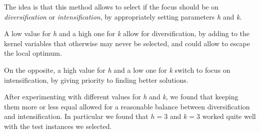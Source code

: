 The idea is that this method allows to select if the focus should be on
\textit{diversification} or \textit{intensification},
by appropriately setting parameters \textit{h} and \textit{k}.

A low value for \textit{h} and a high one for \textit{k} allow for
diversification, by adding to the kernel variables that otherwise
may never be selected, and could allow to escape the local optimum.

On the opposite, a high value for \textit{h} and a low one for \textit{k}
switch to focus on intensification, by giving priority to finding
better solutions.

After experimenting with different values for \textit{h} and \textit{k},
we found that keeping them more or less equal allowed for
a reasonable balance between diversification and intensification.
In particular we found that \(h=3\) and \(k=3\) worked quite well
with the test instances we selected.

